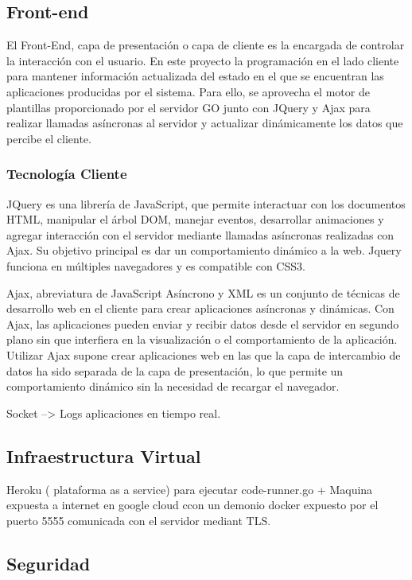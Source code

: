 \documentclass[a4paper,11pt]{book}
\begin{document}
\subsection{Front-end}

El Front-End, capa de presentación o capa de cliente es la encargada de controlar la interacción con el usuario. En este proyecto la programación en el lado cliente para mantener  información actualizada del estado en el que se encuentran las aplicaciones producidas por el sistema. Para ello, se aprovecha el motor de plantillas proporcionado por el servidor GO junto con JQuery y Ajax para realizar llamadas asíncronas al servidor y actualizar dinámicamente los datos que percibe el cliente.

\subsubsection{Tecnología Cliente}


JQuery\cite{jq} es una librería de JavaScript, que permite interactuar con los documentos HTML, manipular el árbol DOM, manejar eventos, desarrollar animaciones y agregar interacción con el servidor mediante llamadas asíncronas realizadas con Ajax. Su objetivo principal es dar un comportamiento dinámico a la web. Jquery funciona en múltiples navegadores y es compatible con CSS3.  

Ajax\cite{aj}, abreviatura de JavaScript Asíncrono y XML es un conjunto de técnicas de desarrollo web en el cliente para crear aplicaciones asíncronas y dinámicas. Con Ajax, las aplicaciones pueden enviar y recibir datos desde el servidor en segundo plano sin que interfiera en la visualización o el comportamiento de la aplicación. Utilizar Ajax supone crear aplicaciones web en las que la capa de intercambio de datos ha sido separada de la capa de presentación, lo que permite un comportamiento dinámico sin la necesidad de recargar el navegador. 


Socket  --> Logs aplicaciones en tiempo real. 

\subsection{Infraestructura Virtual}
Heroku ( plataforma as a service) para ejecutar code-runner.go + Maquina expuesta a internet en google cloud ccon un demonio docker expuesto por el puerto 5555 comunicada con el servidor mediant TLS. 

\subsection{Seguridad}
\end{document}
